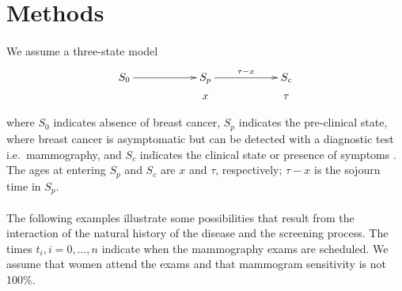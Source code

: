\section{Methods}
% 

\paragraph{}We assume a three-state model 
\begin{displaymath}
\xymatrix @R=0.15cm @C=2cm {
S_0 \ar@{->}[r] & S_p \ar@{->}[r]^{\tau-x} & S_c \\
 & x & \tau \\
}
\end{displaymath}

where $S_0$ indicates absence of breast cancer, $S_p$ indicates the pre-clinical state, where breast cancer is asymptomatic but can be detected with a diagnostic test i.e.\ mammography, and $S_c$ indicates the clinical state or presence of symptoms \cite{Lee1998, Lee2003b}.  The ages at entering $S_p$ and $S_c$ are $x$ and $\tau$, respectively; $\tau-x$ is the sojourn time in $S_p$. 

\paragraph{}The following examples illustrate some possibilities that result from the interaction of the natural history of the disease and the screening process. The times $t_i, i=0,..., n$ indicate when the mammography exams are scheduled. We assume that women attend the exams and that mammogram sensitivity is not 100\%. 

